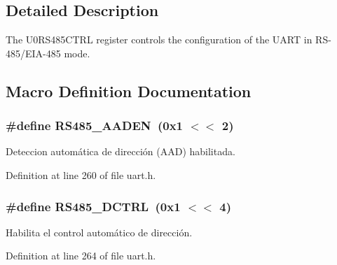 \subsection{Detailed Description}
The U0\+R\+S485\+C\+T\+RL register controls the configuration of the U\+A\+RT in R\+S-\/485/\+E\+I\+A-\/485 mode. 



\subsection{Macro Definition Documentation}
\subsubsection[{\texorpdfstring{R\+S485\+\_\+\+A\+A\+D\+EN}{RS485_AADEN}}]{\setlength{\rightskip}{0pt plus 5cm}\#define R\+S485\+\_\+\+A\+A\+D\+EN~(0x1 $<$$<$ 2)}\hypertarget{group___r_s485_m_o_d_e_ga1b63fc40ac9dea74f6a3822c7e45a0b1}{}\label{group___r_s485_m_o_d_e_ga1b63fc40ac9dea74f6a3822c7e45a0b1}


Deteccion automática de dirección (A\+AD) habilitada. 



Definition at line 260 of file uart.\+h.

\subsubsection[{\texorpdfstring{R\+S485\+\_\+\+D\+C\+T\+RL}{RS485_DCTRL}}]{\setlength{\rightskip}{0pt plus 5cm}\#define R\+S485\+\_\+\+D\+C\+T\+RL~(0x1 $<$$<$ 4)}\hypertarget{group___r_s485_m_o_d_e_gad273c8e4d740c13bd42b605f01c7602a}{}\label{group___r_s485_m_o_d_e_gad273c8e4d740c13bd42b605f01c7602a}


Habilita el control automático de dirección. 



Definition at line 264 of file uart.\+h.

